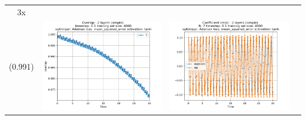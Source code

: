\documentclass{article}
\begin{document}
\begin{tabular}{|c|c|c|c|}
	3x \\ (0.991) &
     \includegraphics[scale=0.37]{./1,2,3x_longer_than_t_total/2_layers_simple_train_samples=4000_timestep=0.1_t_total=3x_optimizer=Adamax_loss=mean_squared_error_activation=tanh/Overlap.png} &
     \includegraphics[scale=0.37]{./1,2,3x_longer_than_t_total/2_layers_simple_train_samples=4000_timestep=0.1_t_total=3x_optimizer=Adamax_loss=mean_squared_error_activation=tanh/Coeff_N=7_(real).png} &

\end{tabular}
\end{document}
